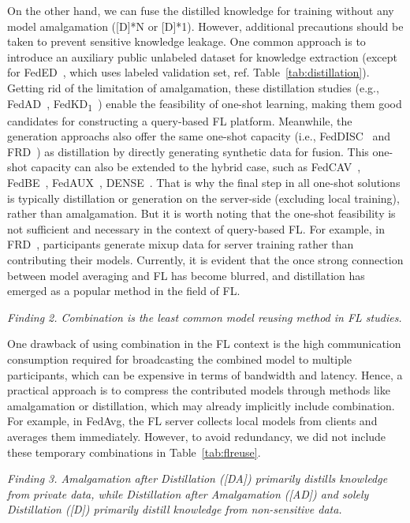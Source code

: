 On the other hand, we can fuse the distilled knowledge for training without any model amalgamation ([D]*N or [D]*1).
However, additional precautions should be taken to prevent sensitive knowledge leakage.
One common approach is to introduce an auxiliary public unlabeled dataset for knowledge extraction (except for FedED~\cite{sui2020feded}, which uses labeled validation set, ref. Table~\ref{tab:distillation}).
Getting rid of the limitation of amalgamation, these distillation studies (e.g., FedAD~\cite{gong2021ensemble}, FedKD\textsubscript{1}~\cite{gong2022preserving}) enable the feasibility of one-shot learning, making them good candidates for constructing a query-based FL platform.
Meanwhile, the generation approachs also offer the same one-shot capacity (i.e., FedDISC~\cite{yang2023exploring} and FRD~\cite{cha2019federated}) as distillation by directly generating synthetic data for fusion.
This one-shot capacity can also be extended to the hybrid case, such as FedCAV~\cite{heinbaugh2023data}, FedBE~\cite{chen2020fedbe}, FedAUX~\cite{sattler2021fedaux}, DENSE~\cite{zhang2022dense}.
That is why the final step in all one-shot solutions is typically distillation or generation on the server-side (excluding local training), rather than amalgamation.
But it is worth noting that the one-shot feasibility is not sufficient and necessary in the context of query-based FL.
For example, in FRD~\cite{cha2019federated}, participants generate mixup data for server training rather than contributing their models.
Currently, it is evident that the once strong connection between model averaging and FL has become blurred, and distillation has emerged as a popular method in the field of FL.

\textit{Finding 2. Combination is the least common model reusing method in FL studies.}

One drawback of using combination in the FL context is the high communication consumption required for broadcasting the combined model to multiple participants, which can be expensive in terms of bandwidth and latency.
Hence, a practical approach is to compress the contributed models through methods like amalgamation or distillation, which may already implicitly include combination. 
For example, in FedAvg, the FL server collects local models from clients and averages them immediately. 
However, to avoid redundancy, we did not include these temporary combinations in Table~\ref{tab:flreuse}.

\textit{Finding 3. Amalgamation after Distillation ([DA]) primarily distills knowledge from private data, while Distillation after Amalgamation ([AD]) and solely Distillation ([D]) primarily distill knowledge from non-sensitive data.}

